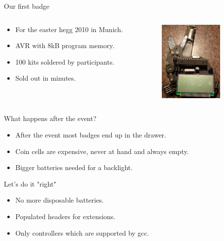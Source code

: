 \documentclass{beamer}
\begin{document}
\begin{frame}{Our first badge}
  \begin{columns}
    \begin{column}{6cm}
        \begin{itemize}
	    \item For the easter hegg 2010 in Munich.
	    \item AVR with 8kB program memory.
	    \item 100 kits soldered by participants.
	    \item Sold out in minutes.
	\end{itemize}
    \end{column}
    \begin{column}{6cm}
        \includegraphics[height=4cm]{bilder/ehaserl.jpg}\\
    \end{column}
  \end{columns}
  \end{frame}
\begin{frame}{What happens after the event?}
	\begin{itemize}
		\item After the event most badges end up in the drawer.
		\item Coin cells are expensive, never at hand and always empty.
		\item Bigger batteries needed for a backlight.
	\end{itemize}
\end{frame}
\begin{frame}{Let's do it "right"}
	\begin{itemize}
		\item No more disposable batteries.
		\item Populated headers for extensions.
		\item Only controllers which are supported by gcc.
	\end{itemize}
\end{frame}
\end{document}
